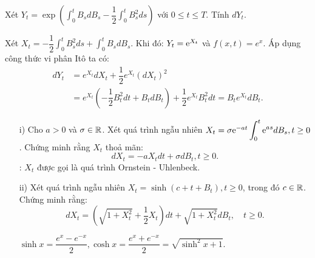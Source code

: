 \begin{exam*}
Xét $Y_t = \exp  \left(\displaystyle \int_0^t B_s dB_s - \dfrac{1}{2} \displaystyle \int_0^t B_s^2 ds \right)$ với $0 \leq t \leq T$. Tính $dY_t$.
\end{exam*}
\begin{sol*}
    Xét $X_t = - \dfrac{1}{2} \displaystyle \int_0^t B_s^2 ds + \displaystyle \int_0^t B_s dB_s$. Khi đó: $Y_t = \mathrm{e}^{X_t}$ và $f(x,t) = e^x$. Áp dụng công thức vi phân Itô ta có:
    \begin{align*}
        dY_t &= e^{X_t} dX_t + \dfrac{1}{2} e^{X_t} (dX_t)^2 \\
        &= e^{X_t} \left(-\dfrac{1}{2} B_t^2 dt + B_t dB_t\right) + \dfrac{1}{2} e^{X_t} B_t^2 dt = B_t e^{X_t} dB_t.
    \end{align*}
\end{sol*}
\begin{exam*}
\begin{itemize}
    \item[i)] Cho $a>0$ và $\sigma \in \mathbb{R}$. Xét quá trình ngẫu nhiên $X_t = \sigma \mathrm{e}^{-at} \displaystyle \int_0^t \mathrm{e}^{as}dB_s, t \geq 0$. Chứng minh rằng $X_t$ thoả mãn: \[dX_t = -aX_tdt+ \sigma dB_t, t \geq 0.\]
    \remarkname: $X_t$ được gọi là quá trình Ornstein - Uhlenbeck.
    \item[ii)] Xét quá trình ngẫu nhiên $X_t = \sinh (c+t+B_t), t \geq 0$, trong đó $c \in \mathbb{R}$. Chứng minh rằng:
    \[dX_t = \left(\sqrt{1+X_t^2} + \dfrac{1}{2}X_t \right)dt + \sqrt{1+X_t^2}dB_t, \quad t \geq 0.\]
    \begin{remark*}
    $\sinh x = \dfrac{e^x - e^{-x}}{2}, \cosh{x} = \dfrac{e^x + e^{-x}}{2} = \sqrt{\sinh^2{x} +1}$.
    \end{remark*}
\end{itemize}
\end{exam*}

